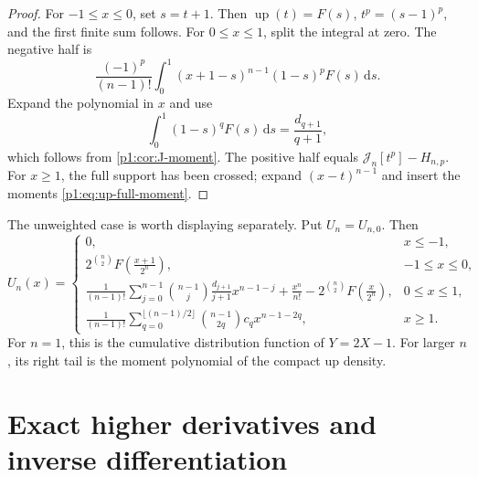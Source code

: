 \documentclass[11pt,oneside]{article}
\theoremstyle{definition}
\theoremstyle{remark}
\newcommand{\Up}{\operatorname{up}}
\newcommand{\dd}{\,\mathrm d}
\newcommand{\Jn}{\mathcal J}
\newcommand{\1}{\mathbf 1}
\begin{document}
\begin{proof}
For \(-1\leq x\leq0\), set \(s=t+1\).  Then
\(\Up(t)=F(s)\), \(t^p=(s-1)^p\), and the first finite sum follows.
For \(0\leq x\leq1\), split the integral at zero.  The negative half is
\[
 \frac{(-1)^p}{(n-1)!}\int_0^1(x+1-s)^{n-1}(1-s)^pF(s)\dd s.
\]
Expand the polynomial in \(x\) and use
\[
 \int_0^1(1-s)^qF(s)\dd s=\frac{d_{q+1}}{q+1},
\]
which follows from \cref{p1:cor:J-moment}.  The positive half equals
\(\Jn_n[t^p]-H_{n,p}\).  For \(x\geq1\), the full support has been crossed;
expand \((x-t)^{n-1}\) and insert the moments
\eqref{p1:eq:up-full-moment}.
\end{proof}

The unweighted case is worth displaying separately.  Put \(U_n=U_{n,0}\).
Then
\begin{equation}
 U_n(x)=
 \begin{cases}
 0,&x\leq-1,\\
 \displaystyle 2^{\binom n2}F\!\left(\frac{x+1}{2^n}\right),
 &-1\leq x\leq0,\\[2mm]
 \displaystyle
 \frac1{(n-1)!}\sum_{j=0}^{n-1}\binom{n-1}{j}
 \frac{d_{j+1}}{j+1}x^{n-1-j}
 +\frac{x^n}{n!}
 -2^{\binom n2}F\!\left(\frac{x}{2^n}\right),
 &0\leq x\leq1,\\[4mm]
 \displaystyle
 \frac1{(n-1)!}\sum_{q=0}^{\lfloor(n-1)/2\rfloor}
 \binom{n-1}{2q}c_qx^{n-1-2q},&x\geq1.
 \end{cases}                                                    \label{p1:eq:up-unweighted-n}
\end{equation}
For \(n=1\), this is the cumulative distribution function of \(Y=2X-1\).
For larger \(n\), its right tail is the moment polynomial of the compact up
density.

\section{Exact higher derivatives and inverse differentiation}
\end{document}
